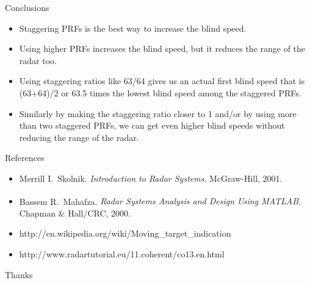 \documentclass[mathserif]{beamer}
\begin{document}
    
    \begin{frame}{Conclusions}
      \begin{itemize}
       \item Staggering PRFs is the best way to increase the blind speed.
       \item Using higher PRFs increases the blind speed, but it reduces the range of the radar too.
       \item Using staggering ratios like 63/64 gives us an actual first blind speed that is (63+64)/2 or 63.5 times the lowest blind speed among the staggered PRFs.
       \item Similarly by making the staggering ratio closer to 1 and/or by using more than two staggered PRFs, we can get even higher blind speeds without reducing the range of the radar.
      \end{itemize}

    \end{frame}


    
    
    \begin{frame}{References}
        
        \begin{itemize}
                 \item Merrill I.~Skolnik. \emph{Introduction to Radar Systems}. McGraw-Hill, 2001.
                 \item Bassem R.~Mahafza. \emph{Radar Systems Analysis and Design Using MATLAB\textsuperscript{\textregistered}}. Chapman \& Hall/CRC, 2000.
                 \item http://en.wikipedia.org/wiki/Moving\_target\_indication
                 \item http://www.radartutorial.eu/11.coherent/co13.en.html
        \end{itemize}
    \end{frame}
    
    
    \begin{frame}[c]
     \begin{center}
       \Huge Thanks
     \end{center}
    \end{frame}

    
\end{document}
